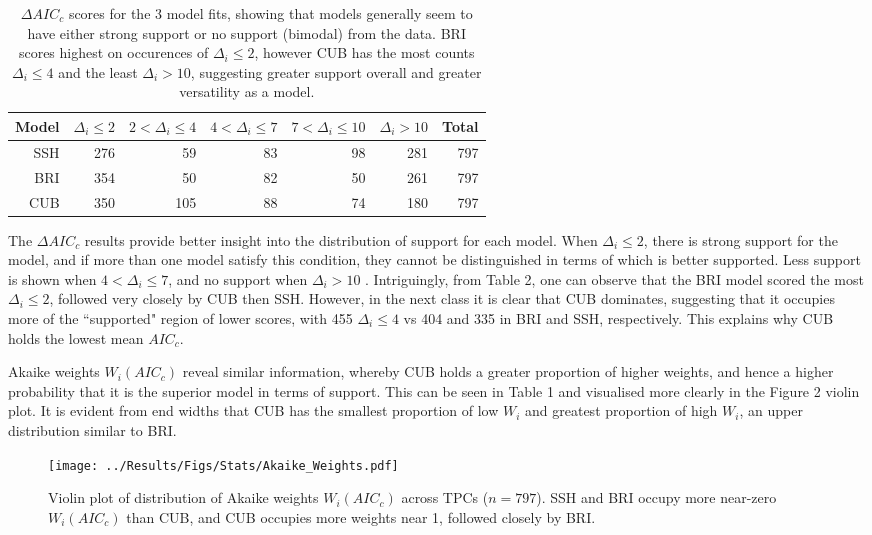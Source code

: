 \documentclass[11pt]{article}
\begin{document}
    \begin{table}[ht]
        \caption{$\Delta$$AIC_c$ scores for the 3 model fits, showing that models generally seem to have either strong support or no support (bimodal) from the data. BRI scores highest on occurences of $\Delta_i \leq 2$, however CUB has the most counts $\Delta_i \leq 4$ and the least $\Delta_i > 10$, suggesting greater support overall and greater versatility as a model.}
        \centering
        \begin{tabular}{rrrrrrr}            
        \hline
        Model & $\Delta_i \leq 2$ & $2 < \Delta_i \leq 4$ & $4 < \Delta_i \leq 7$ & $7 < \Delta_i \leq 10$ & $\Delta_i > 10$ & Total \\ 
        \hline
        SSH & 276 &  59 &  83 &  98 & 281 & 797 \\ 
        BRI & 354 &  50 &  82 &  50 & 261 & 797 \\ 
        CUB & 350 & 105 &  88 &  74 & 180 & 797 \\ 
        \hline
        \end{tabular}
    \end{table}

        The $\Delta$$AIC_c$ results provide better insight into the distribution of support for each model. When $\Delta_i \leq 2$, there is strong support for the model, and if more than one model satisfy this condition, they cannot be distinguished in terms of which is better supported. Less support is shown when $4 < \Delta_i \leq 7$, and no support when $\Delta_i > 10$ \cite{burnham2004multimodel}. Intriguingly, from Table 2, one can observe that the BRI model scored the most $\Delta_i \leq 2$, followed very closely by CUB then SSH. However, in the next class it is clear that CUB dominates, suggesting that it occupies more of the ``supported" region of lower scores, with 455 $\Delta_i \leq 4$ vs 404 and 335 in BRI and SSH, respectively. This explains why CUB holds the lowest mean  $AIC_c$. 

        Akaike weights $W_i(AIC_c)$ reveal similar information, whereby CUB holds a greater proportion of higher weights, and hence a higher probability that it is the superior model in terms of support. This can be seen in Table 1 and visualised more clearly in the Figure 2 violin plot. It is evident from end widths that CUB has the smallest proportion of low $W_i$ and greatest proportion of high $W_i$, an upper distribution similar to BRI. \newpage       
        
        \begin{figure}
            \begin{center}      
            \texttt{[image: ../Results/Figs/Stats/Akaike\_Weights.pdf]}
            \caption{Violin plot of distribution of Akaike weights $W_i(AIC_c)$ across TPCs ($n = 797$). SSH and BRI occupy more near-zero $W_i(AIC_c)$ than CUB, and CUB occupies more weights near 1, followed closely by BRI.}
            \end{center}
        \end{figure}  
\end{document}
